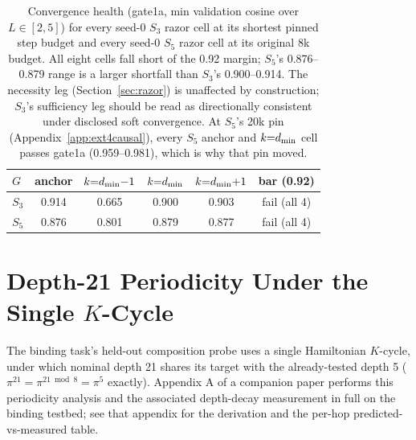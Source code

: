 \begin{table}[H]
\centering
\small
\begin{tabular}{lccccc}
\toprule
$G$ & anchor & $k{=}d_{\min}{-}1$ & $k{=}d_{\min}$ & $k{=}d_{\min}{+}1$ & bar (0.92) \\
\midrule
$S_3$ & 0.914 & 0.665 & 0.900 & 0.903 & fail (all 4) \\
$S_5$ & 0.876 & 0.801 & 0.879 & 0.877 & fail (all 4) \\
\bottomrule
\end{tabular}
\caption{Convergence health (gate1a, min validation cosine over
$L \in [2, 5]$) for every seed-0 $S_3$ razor cell at its shortest pinned
step budget and every seed-0 $S_5$ razor cell at its original 8k budget. All
eight
cells fall short of the 0.92 margin; $S_5$'s 0.876--0.879 range is a
larger shortfall than $S_3$'s 0.900--0.914. The necessity leg
(Section~\ref{sec:razor}) is unaffected by construction; $S_3$'s
sufficiency leg should be read as directionally consistent under
disclosed soft convergence. At $S_5$'s 20k pin
(Appendix~\ref{app:ext4causal}), every $S_5$ anchor and $k{=}d_{\min}$
cell passes gate1a (0.959--0.981), which is why that pin moved.}
\label{tab:gate1a}
\end{table}

\section{Depth-21 Periodicity Under the Single $K$-Cycle}
\label{app:period}
\enlargethispage{2\baselineskip}

The binding task's held-out composition probe uses a single Hamiltonian
$K$-cycle, under which nominal depth 21 shares its target with the
already-tested depth 5 ($\pi^{21} = \pi^{21 \bmod 8} = \pi^5$ exactly).
Appendix A of a companion paper \citep{larson2026companion} performs
this periodicity analysis and the associated depth-decay measurement in
full on the binding testbed; see that appendix for the derivation and
the per-hop predicted-vs-measured table.
\endgroup
